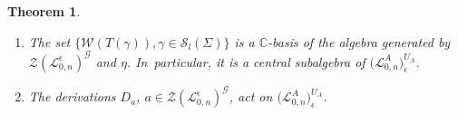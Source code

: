 \documentclass[pdftex]{sigma}%
\numberwithin{equation}{section}
\numberwithin{figure}{section}
\newtheorem{teo}{Theorem}[section]
\newcommand{\e}{\epsilon}
\newcommand{\mc}{\mathbb{C}}
\newcommand{\Gg}{{\mathcal G}}
\newcommand{\Ll}{{\mathcal L}}
\begin{document}
\begin{teo}\label{centerprop1}\quad\samepage

\begin{enumerate}\itemsep=0pt

\item[$(1)$] The set $\{\mathcal{W}(T(\gamma)), \gamma\in\mathcal{S}_l(\Sigma)\}$ is a $\mc$-basis of the algebra generated by $\mathcal{Z}(\Ll_{0,n}^\e)^\Gg$ and $\eta$. In~par\-ti\-cu\-lar, it is a central subalgebra of $\big(\Ll_{0,n}^A\big)^{U_A}_\e$.

\item[$(2)$] The derivations $D_a$, $a\in \mathcal{Z}(\Ll_{0,n}^\e)^\Gg$, act on $\big(\Ll_{0,n}^A\big)^{U_A}_\e$.
 \end{enumerate}
\end{teo}
\end{document}
